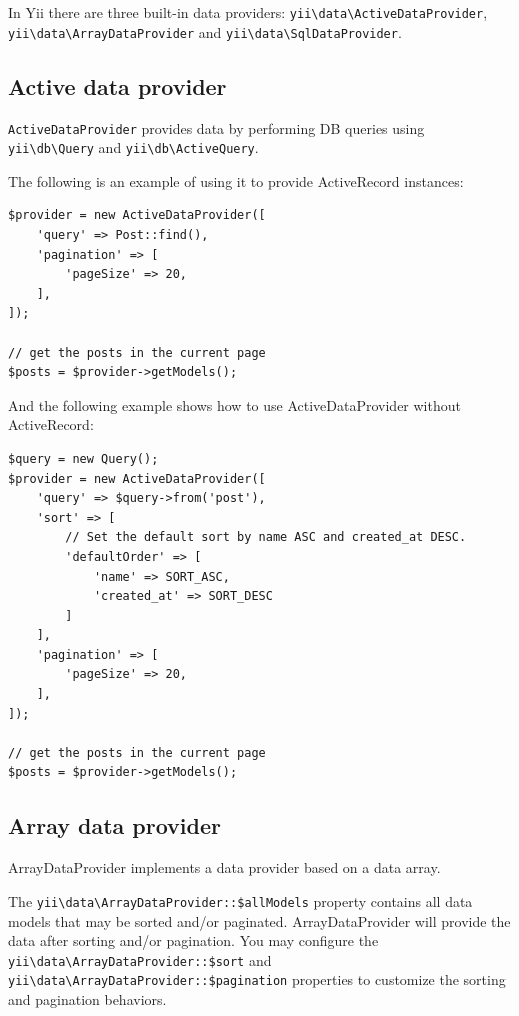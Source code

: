 In Yii there are three built-in data providers: \texttt{yii{\allowbreak{}\textbackslash}data{\allowbreak{}\textbackslash}ActiveDataProvider}, \texttt{yii{\allowbreak{}\textbackslash}data{\allowbreak{}\textbackslash}ArrayDataProvider} and
\texttt{yii{\allowbreak{}\textbackslash}data{\allowbreak{}\textbackslash}SqlDataProvider}.

\subsection{Active data provider}
\lstinline|ActiveDataProvider| provides data by performing DB queries using \texttt{yii{\allowbreak{}\textbackslash}db{\allowbreak{}\textbackslash}Query} and \texttt{yii{\allowbreak{}\textbackslash}db{\allowbreak{}\textbackslash}ActiveQuery}.

The following is an example of using it to provide ActiveRecord instances:

\lstset{language=php}\begin{lstlisting}
$provider = new ActiveDataProvider([
    'query' => Post::find(),
    'pagination' => [
        'pageSize' => 20,
    ],
]);

// get the posts in the current page
$posts = $provider->getModels();
\end{lstlisting}
And the following example shows how to use ActiveDataProvider without ActiveRecord:

\lstset{language=php}\begin{lstlisting}
$query = new Query();
$provider = new ActiveDataProvider([
    'query' => $query->from('post'),
    'sort' => [
        // Set the default sort by name ASC and created_at DESC.
        'defaultOrder' => [
            'name' => SORT_ASC, 
            'created_at' => SORT_DESC
        ]
    ],
    'pagination' => [
        'pageSize' => 20,
    ],
]);

// get the posts in the current page
$posts = $provider->getModels();
\end{lstlisting}
\subsection{Array data provider}
ArrayDataProvider implements a data provider based on a data array.

The \texttt{yii{\allowbreak{}\textbackslash}data{\allowbreak{}\textbackslash}ArrayDataProvider\allowbreak{}::\allowbreak{}\$allModels} property contains all data models that may be sorted and/or paginated.
ArrayDataProvider will provide the data after sorting and/or pagination.
You may configure the \texttt{yii{\allowbreak{}\textbackslash}data{\allowbreak{}\textbackslash}ArrayDataProvider\allowbreak{}::\allowbreak{}\$sort} and \texttt{yii{\allowbreak{}\textbackslash}data{\allowbreak{}\textbackslash}ArrayDataProvider\allowbreak{}::\allowbreak{}\$pagination} properties to
customize the sorting and pagination behaviors.

